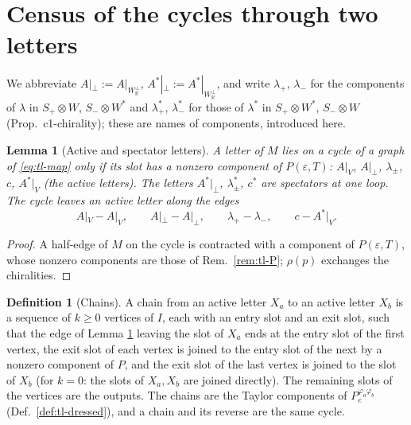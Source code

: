 \documentclass[11pt]{article}
\numberwithin{equation}{section}
\theoremstyle{plain}
\newtheorem{lemma}[theorem]{Lemma}
\theoremstyle{definition}
\newtheorem{definition}[theorem]{Definition}
\begin{document}
\section{Census of the cycles through two letters}
\label{sec:tl-census}

We abbreviate $A|_\perp:=A|_{W_{\mathbb R}^\perp}$, $A^*|_\perp:=A^*|_{W_{\mathbb R}^\perp}$, and write $\lambda_+$, $\lambda_-$ for the components of $\lambda$ in $S_+\otimes W$, $S_-\otimes W^*$ and $\lambda^*_+$, $\lambda^*_-$ for those of $\lambda^*$ in $S_+\otimes W^*$, $S_-\otimes W$ (Prop.~c1-chirality); these are names of components, introduced here.

\begin{lemma}[Active and spectator letters]
\label{lem:tl-active}
A letter of $M$ lies on a cycle of a graph of \eqref{eq:tl-map} only if its slot has a nonzero component of $P(\varepsilon,T)$: $A|_V$, $A|_\perp$, $\lambda_\pm$, $c$, $A^*|_V$ (the active letters). The letters $A^*|_\perp$, $\lambda^*_\pm$, $c^*$ are spectators at one loop. The cycle leaves an active letter along the edges
\[
A|_V\!-\!A|_V,\qquad A|_\perp\!-\!A|_\perp,\qquad \lambda_+\!-\!\lambda_-,\qquad c\!-\!A^*|_V .
\]
\end{lemma}

\begin{proof}
A half-edge of $M$ on the cycle is contracted with a component of $P(\varepsilon,T)$, whose nonzero components are those of Rem.~\ref{rem:tl-P}; $\rho(p)$ exchanges the chiralities.
\end{proof}

\begin{definition}[Chains]
\label{def:tl-chain}
A chain from an active letter $X_a$ to an active letter $X_b$ is a sequence of $k\ge0$ vertices of $I$, each with an entry slot and an exit slot, such that the edge of Lemma \ref{lem:tl-active} leaving the slot of $X_a$ ends at the entry slot of the first vertex, the exit slot of each vertex is joined to the entry slot of the next by a nonzero component of $P$, and the exit slot of the last vertex is joined to the slot of $X_b$ (for $k=0$: the slots of $X_a,X_b$ are joined directly). The remaining slots of the vertices are the outputs. The chains are the Taylor components of $P_e^{\varphi_a\varphi_b}$ (Def.~\ref{def:tl-dressed}), and a chain and its reverse are the same cycle.
\end{definition}
\end{document}
